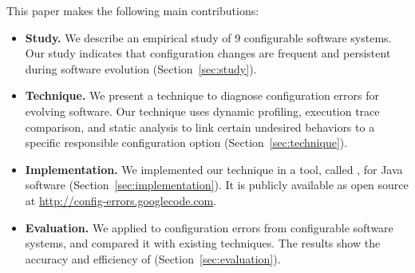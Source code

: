 This paper makes the following main contributions:

\begin{itemize}
\vspace{-3mm}
\item \textbf{Study.} We describe an empirical
study of 9 configurable software systems.
Our study indicates that configuration changes
are frequent and persistent during software evolution (Section~\ref{sec:study}).

\item \textbf{Technique.} We present a technique to diagnose
configuration errors for evolving software. Our technique
uses dynamic profiling, execution trace comparison, and
static analysis to link certain undesired behaviors to a
specific responsible configuration option (Section~\ref{sec:technique}).

\item \textbf{Implementation.} We implemented our technique
in a tool, called \ourtool, for Java software (Section~\ref{sec:implementation}).
It is publicly available as open source at \url{http://config-errors.googlecode.com}.

\item \textbf{Evaluation.} We applied \ourtool to \errornum configuration
errors from \subjnum configurable software systems,
and compared it with existing techniques.
The results show the accuracy and efficiency of \ourtool (Section~\ref{sec:evaluation}).
\end{itemize}

